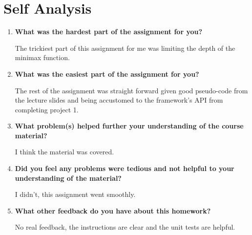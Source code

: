 \documentclass[fleqn]{hw}
\begin{document}
\section{Self Analysis}

\begin{enumerate}
	\item \textbf{What was the hardest part of the assignment for you?}
	
	The trickiest part of this assignment for me was limiting the depth of the minimax function. 
	\item \textbf{What was the easiest part of the assignment for you?}
	
	The rest of the assignment was straight forward given good pseudo-code from the lecture slides and being accustomed to the framework's API from completing project 1.
	\item \textbf{What problem(s) helped further your understanding of the course material?}
	
	I think the material was covered.
	
	\item \textbf{Did you feel any problems were tedious and not helpful to your understanding of the material?}
	
	I didn't, this assignment went smoothly.
	
	\item \textbf{What other feedback do you have about this homework?}
	
	No real feedback, the instructions are clear and the unit tests are helpful.
\end{enumerate}
\end{document}

